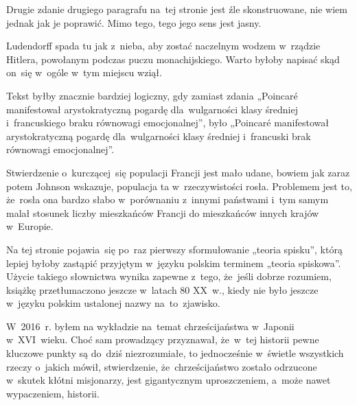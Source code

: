 \documentclass[a4paper,11pt]{article}
\begin{document}
\start {} Drugie zdanie drugiego paragrafu na~tej stronie jest
źle skonstruowane, nie wiem jednak jak je poprawić. Mimo tego, tego
jego sens jest jasny.

\vspace{\spaceFour}



\start {} Ludendorff spada tu jak z~nieba, aby zostać naczelnym
wodzem w~rządzie Hitlera, powołanym podczas puczu monachijskiego.
Warto byłoby napisać skąd on~się w~ogóle w~tym miejscu wziął.

\vspace{\spaceFour}



\start {} Tekst byłby znacznie bardziej logiczny, gdy
zamiast zdania „Poincar\'{e} manifestował arystokratyczną pogardę
dla~wulgarności klasy średniej i~francuskiego braku równowagi
emocjonalnej”, było „Poincar\'{e} manifestował arystokratyczną
pogardę dla~wulgarności klasy średniej i~francuski brak równowagi
emocjonalnej”.

\vspace{\spaceFour}



\start {} Stwierdzenie o~kurczącej~się populacji Francji jest
mało udane, bowiem jak zaraz potem Johnson wskazuje, populacja ta
w~rzeczywistości rosła. Problemem jest to, że~rosła ona bardzo słabo
w~porównaniu z~innymi państwami i~tym samym malał stosunek liczby
mieszkańców Francji do mieszkańców innych krajów w~Europie.

\vspace{\spaceFour}



\start {} Na tej stronie pojawia~się po~raz pierwszy
sformułowanie „teoria spisku”, którą lepiej byłoby zastąpić
przyjętym w~języku polskim terminem „teoria spiskowa”. Użycie
takiego słownictwa wynika zapewne z~tego, że~jeśli dobrze rozumiem,
książkę przetłumaczono jeszcze w~latach 80 XX~w., kiedy nie było
jeszcze w~języku polskim ustalonej nazwy na~to~zjawisko.

\vspace{\spaceFour}



\start {}

\vspace{\spaceFour}



\start {} W~2016~r. byłem na wykładzie na~temat chrześcijaństwa
w~Japonii w~XVI~wieku. Choć sam prowadzący przyznawał, że~w~tej
historii pewne kluczowe punkty są do~dziś niezrozumiałe, to
jednocześnie w~świetle wszystkich rzeczy o~jakich mówił, stwierdzenie,
że~chrześcijaństwo zostało odrzucone w~skutek kłótni misjonarzy, jest
gigantycznym uproszczeniem, a~może nawet wypaczeniem, historii.
\end{document}
